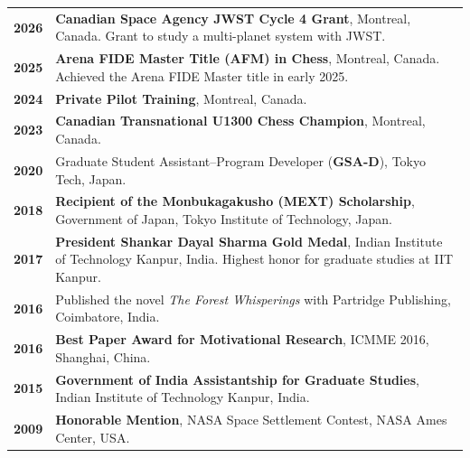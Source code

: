 \documentclass[10pt,a4paper]{article}
\begin{document}
\begin{tabularx}{\textwidth}{
    @{}
    >{\vspace{0pt}\raggedleft\arraybackslash
      \bfseries\color{slate}}p{1.2cm}
    @{\hspace{0.5cm}}
    >{\vspace{0pt}\raggedright\arraybackslash}X
    @{}
}

2026 &
\textbf{Canadian Space Agency JWST Cycle 4 Grant}, Montreal, Canada.
Grant to study a multi-planet system with JWST. \\

2025 &
\textbf{Arena FIDE Master Title (AFM) in Chess}, Montreal, Canada.
Achieved the Arena FIDE Master title in early 2025. \\

2024 &
\textbf{Private Pilot Training}, Montreal, Canada. \\

2023 &
\textbf{Canadian Transnational U1300 Chess Champion}, Montreal, Canada. \\

2020 &
Graduate Student Assistant--Program Developer (\textbf{GSA-D}),
Tokyo Tech, Japan. \\

2018 &
\textbf{Recipient of the Monbukagakusho (MEXT) Scholarship},
Government of Japan, Tokyo Institute of Technology, Japan. \\

2017 &
\textbf{President Shankar Dayal Sharma Gold Medal},
Indian Institute of Technology Kanpur, India.
Highest honor for graduate studies at IIT Kanpur. \\

2016 &
Published the novel \textit{The Forest Whisperings}
with Partridge Publishing, Coimbatore, India. \\

2016 &
\textbf{Best Paper Award for Motivational Research},
ICMME 2016, Shanghai, China. \\

2015 &
\textbf{Government of India Assistantship for Graduate Studies},
Indian Institute of Technology Kanpur, India. \\

2009 &
\textbf{Honorable Mention},
NASA Space Settlement Contest, NASA Ames Center, USA.

\end{tabularx}
\endgroup

\end{document}
